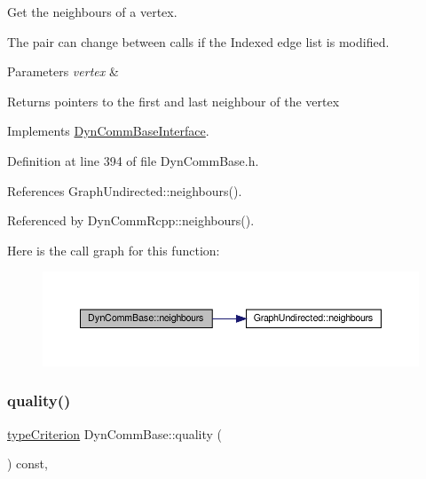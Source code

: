 Get the neighbours of a vertex. 

The pair can change between calls if the Indexed edge list is modified. 
\begin{DoxyParams}{Parameters}
{\em vertex} & \\
\hline
\end{DoxyParams}
\begin{DoxyReturn}{Returns}
pointers to the first and last neighbour of the vertex 
\end{DoxyReturn}


Implements \hyperlink{classDynCommBaseInterface_a9d6f5345d8cdf9e0d70b7a71bff8ade6}{Dyn\+Comm\+Base\+Interface}.



Definition at line 394 of file Dyn\+Comm\+Base.\+h.



References Graph\+Undirected\+::neighbours().



Referenced by Dyn\+Comm\+Rcpp\+::neighbours().

Here is the call graph for this function\+:
\nopagebreak
\begin{figure}[H]
\begin{center}
\leavevmode
\includegraphics[width=350pt]{classDynCommBase_a3500faab82a0547422b2202b79f49718_cgraph}
\end{center}
\end{figure}
\mbox{\label{classDynCommBase_a316b2c63a025810211d205ef6bf1d06c}} 
\subsubsection{\texorpdfstring{quality()}{quality()}}
{\footnotesize\ttfamily \hyperlink{criterionInterface_8h_af71ff22f6355fd69a4a62104bfd59a83}{type\+Criterion} Dyn\+Comm\+Base\+::quality (\begin{DoxyParamCaption}{ }\end{DoxyParamCaption}) const\hspace{0.3cm}{\ttfamily [inline]}, {\ttfamily [virtual]}}

